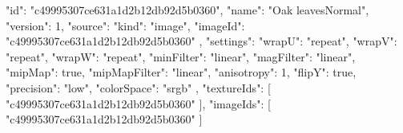 {
  "id": "c49995307ce631a1d2b12db92d5b0360",
  "name": "Oak leavesNormal",
  "version": 1,
  "source": {
    "kind": "image",
    "imageId": "c49995307ce631a1d2b12db92d5b0360"
  },
  "settings": {
    "wrapU": "repeat",
    "wrapV": "repeat",
    "wrapW": "repeat",
    "minFilter": "linear",
    "magFilter": "linear",
    "mipMap": true,
    "mipMapFilter": "linear",
    "anisotropy": 1,
    "flipY": true,
    "precision": "low",
    "colorSpace": "srgb"
  },
  "textureIds": [
    "c49995307ce631a1d2b12db92d5b0360"
  ],
  "imageIds": [
    "c49995307ce631a1d2b12db92d5b0360"
  ]
}
